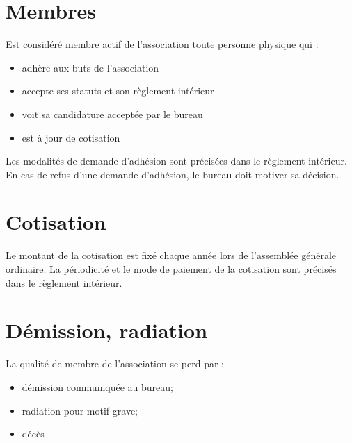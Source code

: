 \documentclass[a4paper, 11pt]{article}
\begin{document}
\section{Membres} %

Est considéré membre actif de l'association toute personne physique qui :

\begin{itemize}
    \item adhère aux buts de l'association
    \item accepte ses statuts et son règlement intérieur
    \item voit sa candidature acceptée par le bureau
    \item est à jour de cotisation
\end{itemize}
Les modalités de demande d'adhésion sont précisées dans le règlement intérieur.
En cas de refus d'une demande d'adhésion, le bureau doit motiver sa décision.

\section{Cotisation} %

Le montant de la cotisation est fixé chaque année lors de l'assemblée générale ordinaire.
La périodicité et le mode de paiement de la cotisation sont précisés dans le règlement intérieur.


\section{Démission, radiation} %

La qualité de membre de l'association se perd par :

\begin{itemize}
    \item démission communiquée au bureau;
    \item radiation pour motif grave;
    \item décès
\end{itemize}
\end{document}
